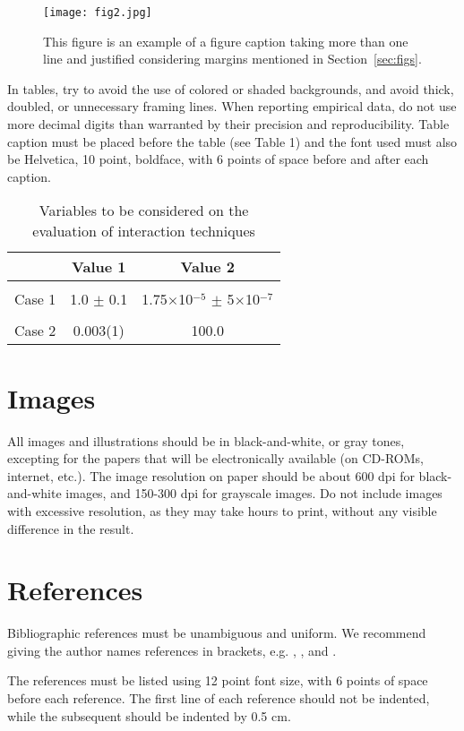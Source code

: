 \documentclass[12pt]{article}
\begin{document}
\begin{figure}[ht]
\centering
\texttt{[image: fig2.jpg]}
\caption{This figure is an example of a figure caption taking more than one
  line and justified considering margins mentioned in Section~\ref{sec:figs}.}
\label{fig:exampleFig2}
\end{figure}

In tables, try to avoid the use of colored or shaded backgrounds, and avoid
thick, doubled, or unnecessary framing lines. When reporting empirical data,
do not use more decimal digits than warranted by their precision and
reproducibility. Table caption must be placed before the table (see Table 1)
and the font used must also be Helvetica, 10 point, boldface, with 6 points of
space before and after each caption.

\begin{table}[ht]
\centering
\caption{Variables to be considered on the evaluation of interaction
  techniques}
\label{tab:exTable1}
\smallskip
\begin{tabular}{|l|c|c|}
\hline
& Value 1 & Value 2\\[0.5ex]
\hline
&&\\[-2ex]
Case 1 & 1.0 $\pm$ 0.1 & 1.75$\times$10$^{-5}$ $\pm$ 5$\times$10$^{-7}$\\[0.5ex]
\hline
&&\\[-2ex]
Case 2 & 0.003(1) & 100.0\\[0.5ex]
\hline
\end{tabular}
\end{table}

\section{Images}

All images and illustrations should be in black-and-white, or gray tones,
excepting for the papers that will be electronically available (on CD-ROMs,
internet, etc.). The image resolution on paper should be about 600 dpi for
black-and-white images, and 150-300 dpi for grayscale images.  Do not include
images with excessive resolution, as they may take hours to print, without any
visible difference in the result.

\section{References}

Bibliographic references must be unambiguous and uniform.  We recommend giving
the author names references in brackets, e.g. \cite{knuth:84},
\cite{boulic:91}, and \cite{smith:99}.

The references must be listed using 12 point font size, with 6 points of space
before each reference. The first line of each reference should not be
indented, while the subsequent should be indented by 0.5 cm.





\end{document}
